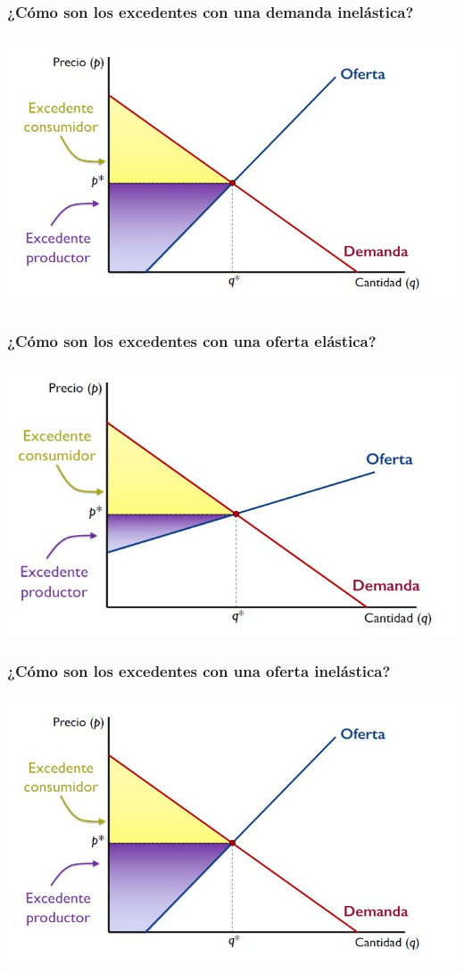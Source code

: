 \documentclass{beamer}
\begin{document}
\begin{frame}
\frametitle{¿Cómo son los excedentes con una demanda inelástica?}
\includegraphics[scale=0.6]{Slides Principios de Economia/Figures/Tema_07.25_equilibrioyexcedente3.jpg}
\end{frame}

\begin{frame}
\frametitle{¿Cómo son los excedentes con una oferta elástica?}
\includegraphics[scale=0.6]{Slides Principios de Economia/Figures/Tema_07.26_equilibrioyexcedente4.jpg}
\end{frame}

\begin{frame}
\frametitle{¿Cómo son los excedentes con una oferta inelástica?}
\includegraphics[scale=0.55]{Slides Principios de Economia/Figures/Tema_07.25_equilibrioyexcedente3.jpg}
\end{frame}
\end{document}
